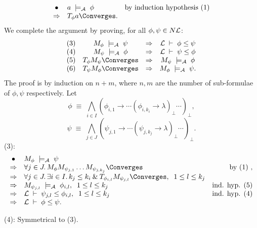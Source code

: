 \[ \begin{array}{clr}
\bullet & a \; \models_{\cal A} \; \phi & 
\mbox{by induction hypothesis (1)} \\
\Rightarrow & T_{\phi} a \Converges . &
\end{array} \]
We complete the argument by proving, for all $\phi , \psi \in N{\cal L}$:
\[ \begin{array}{cccc}
(3)  & M_{\phi} \; \models_{\cal A} \; \psi & \Rightarrow & {\cal L} \; \vdash \; \phi \leq \psi \\
(4)  & M_{\psi} \; \models_{\cal A} \; \phi & \Rightarrow & {\cal L} \; \vdash \; \psi \leq \phi \\
(5) & T_{\phi} M_{\psi} \Converges & \Rightarrow &  M_{\psi} \; \models_{\cal A} \; \phi \\
(6) & T_{\psi} M_{\phi} \Converges & \Rightarrow &  M_{\phi} \; \models_{\cal A} \; \psi .
\end{array} \]
The proof is by induction on $n + m$, where $n, m$ are the number of sub-formulae of $\phi , \psi$ respectively. Let
\[  \phi \; \equiv \; \bigwedge_{i \in I} (\phi_{i, 1} \rightarrow \cdots (\phi_{i, k_{i}} \rightarrow \lambda )_{\bot} \cdots )_{\bot} , \]
\[  \psi \; \equiv \; \bigwedge_{j \in J} (\psi_{j, 1} \rightarrow \cdots (\psi_{j, k_{j}} \rightarrow \lambda )_{\bot} \cdots )_{\bot} . \] 
(3):
\[ \begin{array}{clr}
\bullet & M_{\phi} \; \models_{\cal A} \; \psi & \\ 
\Rightarrow & \forall j \in J . \, M_{\phi}  M_{\psi_{j, 1}} \ldots M_{\psi_{j, k_{j}}} {\Converges} & \mbox{by (1) ,} \\
\Rightarrow & \forall j \in J . \, \exists i \in I . \, k_{j} \leq k_{i} \: \& \: T_{\phi_{i, l}} M_{\psi_{j, l}} \Converges , \;\; 1 \leq l \leq k_{j} & \\
\Rightarrow &  M_{\psi_{j, l}} \; \models_{\cal A} \; \phi_{i, l} , \;\; 1 \leq l \leq k_{j} & \mbox{ind. hyp. (5)} \\
\Rightarrow & {\cal L} \; \vdash \; \psi_{j, l} \leq \phi_{i, l} , \;\; 1 \leq l \leq k_{j} & \mbox{ind. hyp. (4)} \\
\Rightarrow & {\cal L} \; \vdash \; \phi \leq \psi . &
\end{array} \]

\noindent (4): Symmetrical to (3).

